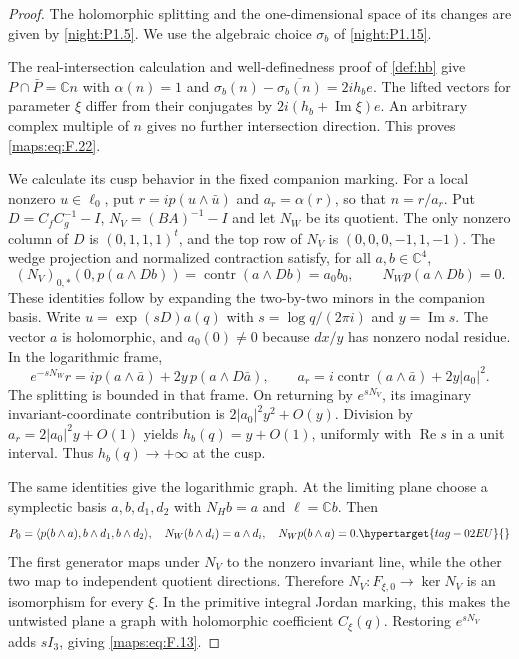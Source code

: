 \begin{proof}
The holomorphic splitting and the one-dimensional space of its changes are given by \cref{night:P1.5}. We use the algebraic choice $\sigma_b$ of \cref{night:P1.15}.

The real-intersection calculation and well-definedness proof of
\cref{def:hb} give $P\cap\bar P=\mathbb Cn$ with
$\alpha(n)=1$ and
$\sigma_b(n)-\overline{\sigma_b(n)}=2ih_b e$.
The lifted vectors for parameter $\xi$ differ from their
conjugates by $2i(h_b+\operatorname{Im}\xi)e$.
An arbitrary complex multiple of $n$ gives no further
intersection direction. This proves \eqref{maps:eq:F.22}.

We calculate its cusp behavior in the fixed companion marking.
For a local nonzero $u\in\ell_0$, put $r=ip(u\wedge\bar u)$
and $a_r=\alpha(r)$, so that $n=r/a_r$.
Put $D=C_fC_g^{-1}-I$, $N_V=(BA)^{-1}-I$ and let $N_W$ be its
quotient. The only nonzero column of $D$ is
$(0,1,1,1)^t$, and the top row of $N_V$ is
$(0,0,0,-1,1,-1)$. The wedge projection and normalized contraction
satisfy, for all $a,b\in\mathbb C^4$,
\[
 (N_V)_{0,*}(0,p(a\wedge Db))
 =\operatorname{contr}(a\wedge Db)=a_0b_0,
 \qquad N_Wp(a\wedge Db)=0.
\]
These identities follow by expanding the two-by-two minors in
the companion basis. Write $u=\exp(sD)a(q)$ with
$s=\log q/(2\pi i)$ and $y=\operatorname{Im}s$.
The vector $a$ is holomorphic, and $a_0(0)\ne0$ because
$dx/y$ has nonzero nodal residue. In the logarithmic frame,
\[
 e^{-sN_W}r=ip(a\wedge\bar a)+2y\,p(a\wedge D\bar a),
 \qquad
 a_r=i\operatorname{contr}(a\wedge\bar a)+2y|a_0|^2.
\]
The splitting is bounded in that frame. On returning by
$e^{sN_V}$, its imaginary invariant-coordinate contribution is
$2|a_0|^2y^2+O(y)$. Division by
$a_r=2|a_0|^2y+O(1)$ yields
$h_b(q)=y+O(1)$, uniformly with $\operatorname{Re}s$ in a unit
interval. Thus $h_b(q)\to+\infty$ at the cusp.

The same identities give the logarithmic graph. At the limiting
plane choose a symplectic basis $a,b,d_1,d_2$ with $N_Hb=a$
and $\ell=\mathbb Cb$. Then
\begin{equation}
 P_0=\langle p(b\wedge a),b\wedge d_1,b\wedge d_2\rangle,
 \quad N_W(b\wedge d_i)=a\wedge d_i,
 \quad N_Wp(b\wedge a)=0.
 \hypertarget{tag-02EU}{}\label{maps:eq:F.23}
\end{equation}
The first generator maps under $N_V$ to the nonzero invariant
line, while the other two map to independent quotient directions.
Therefore $N_V:F_{\xi,0}\to\ker N_V$ is an isomorphism for
every $\xi$. In the primitive integral Jordan marking, this
makes the untwisted plane a graph with holomorphic coefficient
$C_\xi(q)$. Restoring $e^{sN_V}$ adds $sI_3$, giving
\eqref{maps:eq:F.13}.


\end{proof}
